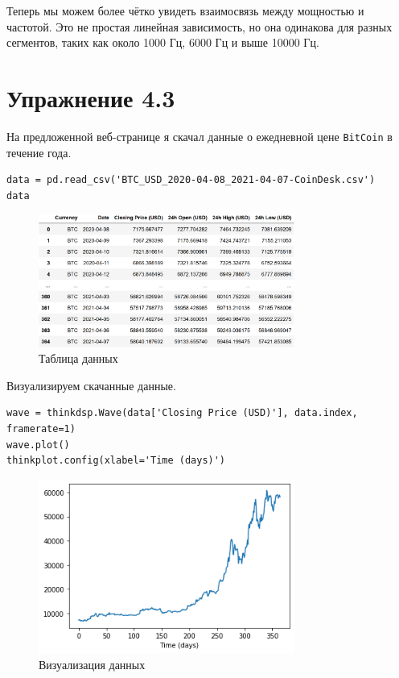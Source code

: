 \documentclass[a4paper,12pt]{report}
\begin{document}
Теперь мы можем более чётко увидеть взаимосвязь между мощностью и частотой. Это не простая линейная зависимость, но она одинакова для разных сегментов, таких как около 1000 Гц, 6000 Гц и выше 10000 Гц.

\chapter{Упражнение 4.3}

На предложенной веб-странице я скачал данные о ежедневной цене \texttt{BitCoin} в течение года.

\begin{lstlisting}[caption=Таблица данных]
data = pd.read_csv('BTC_USD_2020-04-08_2021-04-07-CoinDesk.csv')
data
\end{lstlisting}

\begin{figure}[H]
        \centering
        \includegraphics[width=0.75\textwidth]{lab4_fig3_1.png}
        \caption{Таблица данных}
        \label{fig:lab4_fig3_1}
\end{figure}

Визуализируем скачанные данные.

\begin{lstlisting}[caption=Визуализация данных]
wave = thinkdsp.Wave(data['Closing Price (USD)'], data.index, framerate=1)
wave.plot()
thinkplot.config(xlabel='Time (days)')
\end{lstlisting}

\begin{figure}[H]
        \centering
        \includegraphics[width=0.75\textwidth]{lab4_fig3_2.png}
        \caption{Визуализация данных}
        \label{fig:lab4_fig3_2}
\end{figure}
\end{document}
